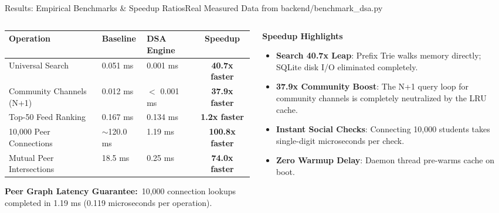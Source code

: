 \documentclass[aspectratio=169,10pt]{beamer}
\begin{document}
\begin{frame}[t]{Results: Empirical Benchmarks \& Speedup Ratios}{Real Measured Data from backend/benchmark\_dsa.py}
  \begin{columns}[t]
    \begin{column}{0.56\textwidth}
      \vspace{-0.1cm}
      \begin{center}
      \fontsize{7.2}{9.0}\selectfont
      \setlength{\tabcolsep}{2.5pt}
      \begin{tabular}{lllc}
        \toprule
        \textbf{\textcolor{KoinexaRed}{Operation}} & \textbf{Baseline} & \textbf{DSA Engine} & \textbf{\textcolor{KoinexaRed}{Speedup}} \\
        \midrule
        Universal Search & 0.051 ms & 0.001 ms & \textbf{40.7x faster} \\
        Community Channels (N+1) & 0.012 ms & $<$ 0.001 ms & \textbf{37.9x faster} \\
        Top-50 Feed Ranking & 0.167 ms & 0.134 ms & \textbf{1.2x faster} \\
        10,000 Peer Connections & $\sim$120.0 ms & 1.19 ms & \textbf{100.8x faster} \\
        Mutual Peer Intersections & 18.5 ms & 0.25 ms & \textbf{74.0x faster} \\
        \bottomrule
      \end{tabular}
      \end{center}
      \vspace{0.15cm}
      {\fontsize{8.0}{10.0}\selectfont\textbf{\textcolor{KoinexaOrange}{Peer Graph Latency Guarantee:}}\ 10,000 connection lookups completed in 1.19 ms (0.119 microseconds per operation).}
    \end{column}
    \begin{column}{0.42\textwidth}
      {\fontsize{9.0}{11.0}\selectfont\textbf{\textcolor{KoinexaRed}{Speedup Highlights}}}\par\vspace{1.5pt}
      \begin{itemize}\setlength{\itemsep}{2.0pt}
        \item {\fontsize{8.0}{9.8}\selectfont \textbf{Search 40.7x Leap}: Prefix Trie walks memory directly; SQLite disk I/O eliminated completely.}
        \item {\fontsize{8.0}{9.8}\selectfont \textbf{37.9x Community Boost}: The N+1 query loop for community channels is completely neutralized by the LRU cache.}
        \item {\fontsize{8.0}{9.8}\selectfont \textbf{Instant Social Checks}: Connecting 10,000 students takes single-digit microseconds per check.}
        \item {\fontsize{8.0}{9.8}\selectfont \textbf{Zero Warmup Delay}: Daemon thread pre-warms cache on boot.}
      \end{itemize}
    \end{column}
  \end{columns}
\end{frame}
\end{document}

